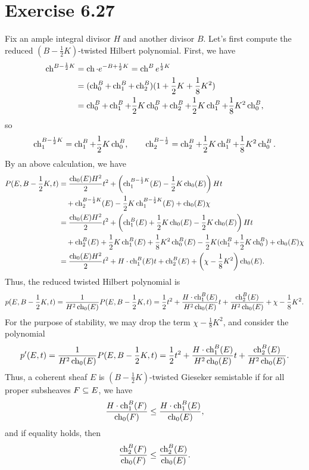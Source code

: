\documentclass[letterpaper,10pt]{article}
\begin{document}
\section{Exercise 6.27}
Fix an ample integral divisor $H$ and another divisor $B$. Let's first compute the reduced $(B - \frac{1}{2}K)$-twisted Hilbert polynomial. First, we have
\begin{align*} 
    \ch^{B-\frac{1}{2}K} & = \ch \cdot e^{-B+\frac{1}{2}K} = \ch^B e^{\frac{1}{2}K} \\
        & = (\ch_0^B + \ch_1^B + \ch_2^B)(1 + \frac{1}{2}K + \frac{1}{8}K^2) \\
        & = \ch_0^B + \ch_1^B + \frac{1}{2}K \ch_0^B + \ch_2^B + \frac{1}{2} K \ch_1^B + \frac{1}{8} K^2 \ch_0^B,
\end{align*}
so
\[ \ch_1^{B-\frac{1}{2}K} = \ch_1^B + \frac{1}{2}K \ch_0^B, \qquad \ch_2^{B-\frac{1}{2}} = \ch_2^B + \frac{1}{2} K \ch_1^B + \frac{1}{8} K^2 \ch_0^B. \]
By an above calculation, we have
\begin{align*}
    P(E, B - \frac{1}{2}K, t) & = \frac{\ch_0(E) H^2}{2} t^2 + \left(\ch_1^{B- \frac{1}{2}K}(E) - \frac{1}{2} K \ch_0(E)\right) H t \\
    & \quad + \ch_2^{B- \frac{1}{2}K}(E) - \frac{1}{2} K \ch_1^{B-\frac{1}{2}K}(E) + \ch_0(E) \chi \\
    & = \frac{\ch_0(E) H^2}{2} t^2 + \left(\ch_1^B(E) + \frac{1}{2} K \ch_0(E) - \frac{1}{2} K \ch_0(E)\right) H t \\
    & \quad + \ch_2^B(E) + \frac{1}{2} K \ch_1^B(E) + \frac{1}{8} K^2 \ch_0^B(E) - \frac{1}{2} K (\ch_1^B + \frac{1}{2}K \ch_0^B) + \ch_0(E) \chi \\
    & = \frac{\ch_0(E) H^2}{2} t^2 + H\cdot\ch_1^B(E) t + \ch_2^B(E) + \left(\chi - \frac{1}{8}K^2\right)\ch_0(E).
\end{align*}
Thus, the reduced twisted Hilbert polynomial is
\[ p(E, B-\frac{1}{2}K, t) = \frac{1}{H^2 \ch_0(E)} P(E, B - \frac{1}{2}K, t) = \frac{1}{2} t^2 + \frac{H\cdot\ch_1^B(E)}{H^2 \ch_0(E)} t + \frac{\ch_2^B(E)}{H^2 \ch_0(E)} + \chi - \frac{1}{8}K^2. \]
For the purpose of stability, we may drop the term $\chi - \frac{1}{8}K^2$, and consider the polynomial
\[ p'(E, t) = \frac{1}{H^2 \ch_0(E)} P(E, B - \frac{1}{2}K, t) = \frac{1}{2} t^2 + \frac{H\cdot\ch_1^B(E)}{H^2 \ch_0(E)} t + \frac{\ch_2^B(E)}{H^2 \ch_0(E)}. \]
Thus, a coherent sheaf $E$ is $(B - \frac{1}{2}K)$-twisted Gieseker semistable if for all proper subsheaves $F \subs E$, we have
\[ \frac{H\cdot\ch_1^B(F)}{\ch_0(F)} \le \frac{H\cdot\ch_1^B(E)}{\ch_0(E)}, \]
and if equality holds, then
\[ \frac{\ch_2^B(F)}{\ch_0(F)} \le \frac{\ch_2^B(E)}{\ch_0(E)}. \]
\end{document}
